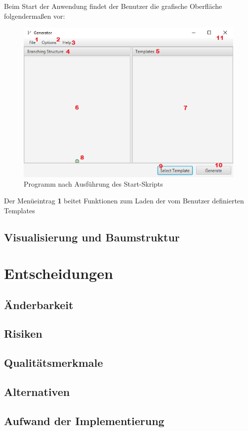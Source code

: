 Beim Start der Anwendung findet der Benutzer die grafische Oberfläche folgendermaßen vor:
\begin{figure}[H]
    \centering
    \includegraphics[width=14cm]{../images/UI_numbers.png}
    \caption{Programm nach Ausführung des Start-Skripts}
\end{figure}
Der Menüeintrag \textbf{1} beitet Funktionen zum Laden der vom Benutzer definierten Templates

\subsection*{Visualisierung und Baumstruktur}

\section{Entscheidungen}

\subsection*{Änderbarkeit}
\subsection*{Risiken}
\subsection*{Qualitätsmerkmale}
\subsection*{Alternativen}
\subsection*{Aufwand der Implementierung}